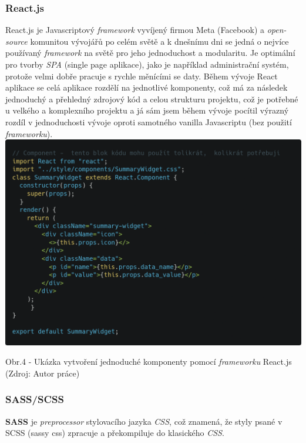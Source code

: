 \documentclass[12pt,a4paper]{report}
\begin{document}
  \subsubsection{React.js}
  React.js je Javascriptový \emph{framework} vyvíjený firmou Meta (Facebook) a \emph{open-source} komunitou
  vývojářů po celém světě a k dnešnímu dni se jedná o nejvíce používaný \emph{framework} na světě pro
  jeho jednoduchost a modularitu.
  Je optimální pro tvorby \emph{SPA} (single page aplikace), jako je například administrační systém, protože
  velmi dobře pracuje s rychle měnícími se daty. Během vývoje React aplikace se celá aplikace
  rozdělí na jednotlivé komponenty, což má za následek jednoduchý a přehledný zdrojový kód a
  celou strukturu projektu, což je potřebné u velkého a komplexního projektu a já sám jsem během
  vývoje pocítil výrazný rozdíl v jednoduchosti vývoje oproti samotného vanilla Javascriptu (bez
  použití \emph{frameworku}).
  \vfill
  \vspace*{0.5cm}
  \noindent\includegraphics[width=\linewidth]{reactCodeblock.png}
  \begin{center}
    Obr.4 - Ukázka vytvoření jednoduché komponenty pomocí \emph{frameworku} React.js \\
    (Zdroj: Autor práce)
  \end{center}

  \subsubsection{SASS/SCSS}
  \textbf{SASS} je \emph{preprocessor} stylovacího jazyka \emph{CSS}, což znamená, že styly psané v SCSS (sassy css)
  zpracuje a překompiluje do klasického \emph{CSS}.
  
\end{document}
